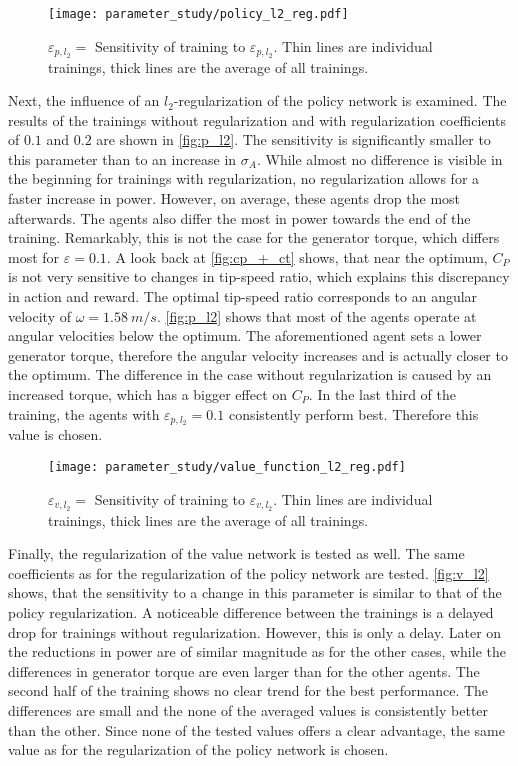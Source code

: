 \begin{figure}[ht]
	\centering
	\texttt{[image: parameter\_study/policy\_l2\_reg.pdf]}
	\caption{$\varepsilon_{p,l_2}=$ Sensitivity of training to $\varepsilon_{p,l_2}$. Thin lines are individual trainings, thick lines are the average of all trainings.}
	\label{fig:p_l2}
\end{figure}
Next, the influence of an $l_2$-regularization of the policy network is examined. The results of the trainings without regularization and with regularization coefficients of $0.1$ and $0.2$ are shown in \autoref{fig:p_l2}. The sensitivity is significantly smaller to this parameter than to an increase in $\sigma_A$. While almost no difference is visible in the beginning for trainings with regularization, no regularization allows for a faster increase in power. However, on average, these agents drop the most afterwards. The agents also differ the most in power towards the end of the training. Remarkably, this is not the case for the generator torque, which differs most for $\varepsilon = 0.1$. A look back at \autoref{fig:cp_+_ct} shows, that near the optimum, $C_P$ is not very sensitive to changes in tip-speed ratio, which explains this discrepancy in action and reward. The optimal tip-speed ratio corresponds to an angular velocity of $\omega=\SI{1.58}{m/s}$. \autoref{fig:p_l2} shows that most of the agents operate at angular velocities below the optimum. The aforementioned agent sets a lower generator torque, therefore the angular velocity increases and is actually closer to the optimum. The difference in the case without regularization is caused by an increased torque, which has a bigger effect on $C_P$. In the last third of the training, the agents with $\varepsilon_{p,l_2}=0.1$ consistently perform best. Therefore this value is chosen. \\
\begin{figure}[h]%
	\centering
	\texttt{[image: parameter\_study/value\_function\_l2\_reg.pdf]}
	\caption{$\varepsilon_{v,l_2}=$ Sensitivity of training to $\varepsilon_{v,l_2}$. Thin lines are individual trainings, thick lines are the average of all trainings.}
	\label{fig:v_l2}
\end{figure}
Finally, the regularization of the value network is tested as well. The same coefficients as for the regularization of the policy network are tested. \autoref{fig:v_l2} shows, that the sensitivity to a change in this parameter is similar to that of the policy regularization. A noticeable difference between the trainings is a delayed drop for trainings without regularization. However, this is only a delay. Later on the reductions in power are of similar magnitude as for the other cases, while the differences in generator torque are even larger than for the other agents. The second half of the training shows no clear trend for the best performance. The differences are small and the none of the averaged values is consistently better than the other. Since none of the tested values offers a clear advantage, the same value as for the regularization of the policy network is chosen.\\
